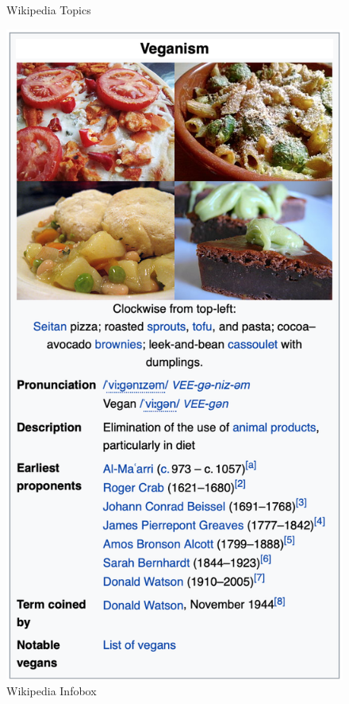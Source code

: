 \documentclass[a4paper]{article}
\begin{document}
\begin{figure}[H]
\begin{minipage}[b]{0.4\textwidth}
    \caption{Wikipedia Topics}
    \label{fig:topics}
  \end{minipage}
  \hfill
  \begin{minipage}[b]{0.4\textwidth}
    \includegraphics[width=\textwidth]{imgs/infobox}
    \caption{Wikipedia Infobox}
    \label{fig:infobox}
  \end{minipage}
\end{figure}
\end{document}
